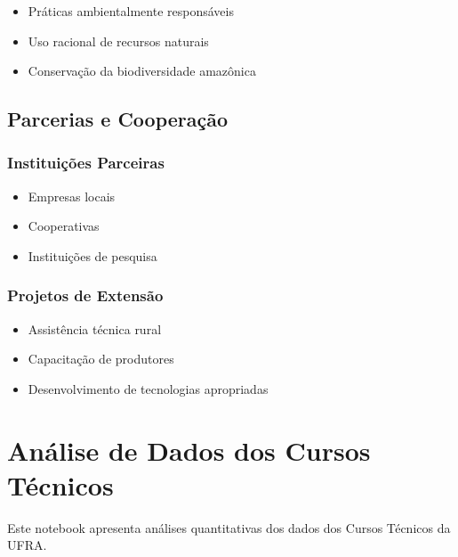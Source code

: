\documentclass[
  12pt,
  letterpaper,
]{report}
\providecommand{\tightlist}{%
  \setlength{\itemsep}{0pt}\setlength{\parskip}{0pt}}\usepackage{longtable,booktabs,array}
\begin{document}
\begin{itemize}
\tightlist
\item
  Práticas ambientalmente responsáveis
\item
  Uso racional de recursos naturais
\item
  Conservação da biodiversidade amazônica
\end{itemize}

\section{Parcerias e Cooperação}\label{parcerias-e-cooperauxe7uxe3o}

\subsection{Instituições Parceiras}\label{instituiuxe7uxf5es-parceiras}

\begin{itemize}
\tightlist
\item
  Empresas locais
\item
  Cooperativas
\item
  Instituições de pesquisa
\end{itemize}

\subsection{Projetos de Extensão}\label{projetos-de-extensuxe3o}

\begin{itemize}
\tightlist
\item
  Assistência técnica rural
\item
  Capacitação de produtores
\item
  Desenvolvimento de tecnologias apropriadas
\end{itemize}


\chapter{Análise de Dados dos Cursos
Técnicos}\label{anuxe1lise-de-dados-dos-cursos-tuxe9cnicos}

Este notebook apresenta análises quantitativas dos dados dos Cursos
Técnicos da UFRA.
\end{document}
